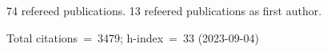 74 refereed publications. 13 refeered publications as first author.

Total citations~=~3479; h-index~=~33 (2023-09-04)
